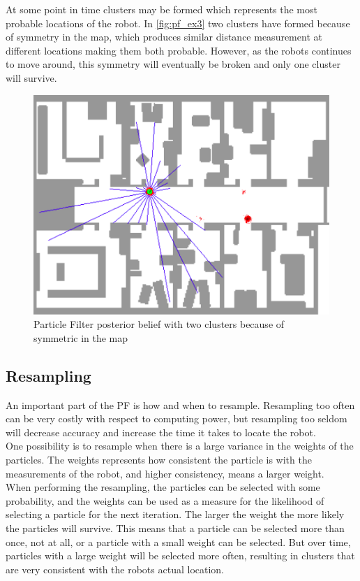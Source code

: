 At some point in time clusters may be formed which represents the most probable locations of the robot. In \autoref{fig:pf_ex3} two clusters have formed because of symmetry in the map, which produces similar distance measurement at different locations making them both probable. However, as the robots continues to move around, this symmetry will eventually be broken and only one cluster will survive.

\begin{figure}[H]
\centering
\includegraphics[scale=0.35]{images/particlefilter3}
\caption{Particle Filter posterior belief with two clusters because of symmetric in the map}
\label{fig:pf_ex3}
\end{figure}

\subsection{Resampling}

An important part of the PF is how and when to resample. Resampling too often can be very costly with respect to computing power, but resampling too seldom will decrease accuracy and increase the time it takes to locate the robot.\\

One possibility is to resample when there is a large variance in the weights of the particles. The weights represents how consistent the particle is with the measurements of the robot, and higher consistency, means a larger weight.\\

When performing the resampling, the particles can be selected with some probability, and the weights can be used as a measure for the likelihood of selecting a particle for the next iteration. The larger the weight the more likely the particles will survive. This means that a particle can be selected more than once, not at all, or a particle with a small weight can be selected. But over time, particles with a large weight will be selected more often, resulting in clusters that are very consistent with the robots actual location.
